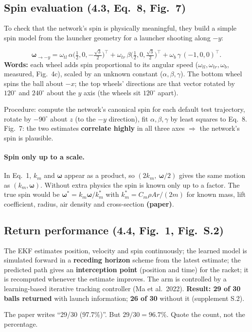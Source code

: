 \documentclass[11pt,a4paper]{article}
\newcommand{\ww}{\boldsymbol{\omega}}
\begin{document}
\subsection{Spin evaluation (4.3, Eq.~8, Fig.~7)}
To check that the network's spin is physically meaningful, they build a simple spin model from the launcher geometry for a launcher shooting along $-y$:
\begin{eqbox}
\[
\ww_{\rightarrow-y}=\omega_{tl}\,\alpha\Big(\tfrac12,0,-\tfrac{\sqrt3}{2}\Big)^{\!\top}+\omega_{tr}\,\beta\Big(\tfrac12,0,\tfrac{\sqrt3}{2}\Big)^{\!\top}+\omega_b\,\gamma\,(-1,0,0)^\top .
\]
\textbf{Words:} each wheel adds spin proportional to its angular speed ($\omega_{tl},\omega_{tr},\omega_b$, measured, Fig.~4c), scaled by an unknown constant ($\alpha,\beta,\gamma$).
The bottom wheel spins the ball about $-x$; the top wheels' directions are that vector rotated by $120^\circ$ and $240^\circ$ about the $y$ axis (the wheels sit $120^\circ$ apart).
\end{eqbox}
Procedure: compute the network's canonical spin for each default test trajectory, rotate by $-90^\circ$ about $z$ (to the $-y$ direction), fit $\alpha,\beta,\gamma$ by least squares to Eq.~8.
Fig.~7: the two estimates \textbf{correlate highly} in all three axes $\Rightarrow$ the network's spin is plausible.

\paragraph{Spin only up to a scale.} In Eq.~1, $k_m$ and $\ww$ appear as a product, so $(2k_m,\ \ww/2)$ gives the same motion as $(k_m,\ww)$. Without extra physics the spin is known only up to a factor.
The true spin would be $\ww^*=k_m\ww/k_m^*$ with $k_m^*=C_m\rho Ar/(2m)$ for known mass, lift coefficient, radius, air density and cross-section \textbf{(paper)}.

\subsection{Return performance (4.4, Fig.~1, Fig.~S.2)}
The EKF estimates position, velocity and spin continuously; the learned model is simulated forward in a \textbf{receding horizon} scheme from the latest estimate; the predicted path gives an \textbf{interception point} (position and time) for the racket;
it is recomputed whenever the estimate improves. The arm is controlled by a learning-based iterative tracking controller (Ma et al.\ 2022).
\textbf{Result: 29 of 30 balls returned} with launch information; \textbf{26 of 30} without it (supplement S.2).
\begin{warn}
The paper writes ``29/30 (97.7\%)''. But $29/30=96.7\%$. Quote the count, not the percentage.
\end{warn}
\end{document}
